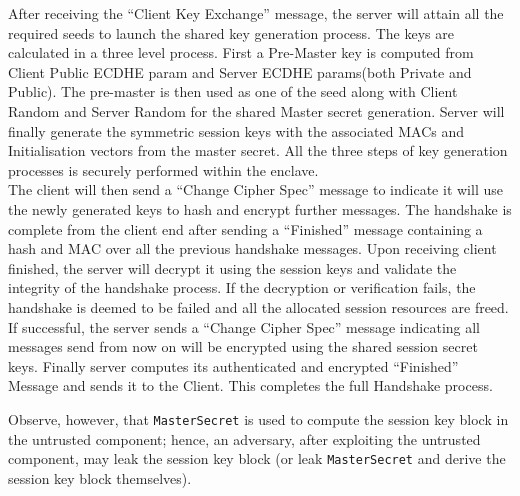 \documentclass[../../main.tex]{subfiles}
\begin{document}
\noindent
After receiving the “Client Key Exchange” message, the server will
attain all the required seeds to launch the shared key generation
process. The keys are calculated in a three level process. First a
Pre-Master key is computed from Client Public ECDHE param and Server
ECDHE params(both Private and Public).  The pre-master is then used as
one of the seed along with Client Random and Server Random for the
shared Master secret generation. Server will finally generate the
symmetric session keys with the associated MACs and Initialisation
vectors from the master secret. All the three steps of key
generation processes is securely performed within the enclave.\\

\noindent
The client will then send a “Change Cipher Spec” message to indicate
it will use the newly generated keys to hash and encrypt further
messages. The handshake is complete from the client end after sending
a “Finished” message containing a hash and MAC over all the previous
handshake messages. Upon receiving client finished, the server will
decrypt it using the session keys and validate the integrity of the
handshake process. If the decryption or verification fails, the
handshake is deemed to be failed and all the allocated session
resources are freed. If successful, the server sends a “Change Cipher
Spec” message indicating all messages send from now on will be
encrypted using the shared session secret keys. Finally server
computes its authenticated and encrypted “Finished” Message and sends
it to the Client. This completes the full Handshake process.

Observe, however, that \texttt{MasterSecret} is used to compute the
session key block in the untrusted component; hence, an adversary,
after exploiting the untrusted component, may leak the session key
block (or leak \texttt{MasterSecret} and derive the session key block
themselves). 
\end{document}

